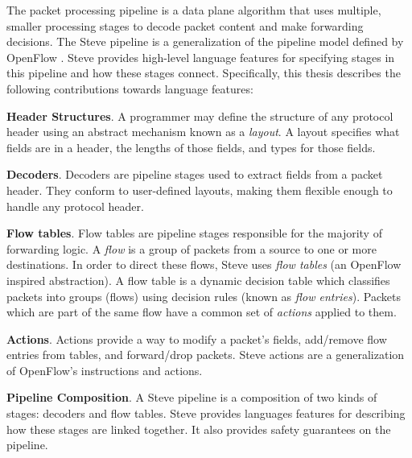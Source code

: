 The packet processing pipeline is a data plane algorithm that
uses multiple, smaller processing stages to decode packet content and make
forwarding decisions.
The Steve pipeline is a generalization
of the pipeline model defined by OpenFlow \cite{openflow_spec}.
Steve provides high-level language features for specifying
stages in this pipeline and how these stages connect.
Specifically, this thesis describes the following contributions towards language features:

\textbf{Header Structures}.
A programmer may define the structure of any protocol header using an abstract
mechanism known as a \emph{layout}.
A layout specifies what fields are in a header, the lengths of those fields,
and types for those fields.

\textbf{Decoders}. Decoders are pipeline stages used to extract
fields from a packet header.
They conform to user-defined layouts, making them flexible enough
to handle any protocol header.

%

\textbf{Flow tables}.
Flow tables are pipeline stages responsible for the majority of forwarding logic.
A \emph{flow} is a group of packets from a source to one
or more  destinations. In order to direct these flows, Steve uses \emph{flow tables} (an OpenFlow inspired abstraction).
A flow table is a dynamic
decision table which classifies packets into groups (flows) using
decision rules (known as \emph{flow entries}).
Packets which are part of the same flow have a common set of \emph{actions}
applied to them.

\textbf{Actions}. Actions provide a way to modify a packet's fields, add/remove
flow entries from tables, and forward/drop packets. Steve actions are a
generalization
of OpenFlow's instructions and actions.

\textbf{Pipeline Composition}. A Steve pipeline is a composition of two kinds of
stages: decoders and flow tables.
Steve provides languages features for describing how these stages are linked
together. It also provides safety guarantees on the pipeline.

